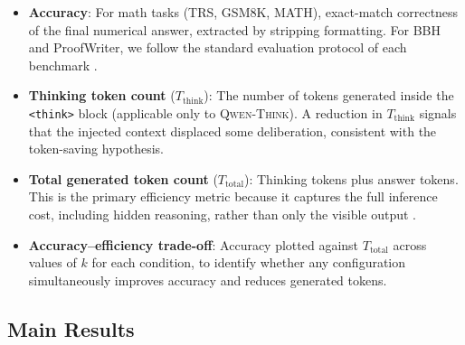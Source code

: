 \begin{itemize}
  \item \textbf{Accuracy}: For math tasks (TRS, GSM8K, MATH), exact-match
        correctness of the final numerical answer, extracted by stripping formatting.
        For BBH and ProofWriter, we follow the standard evaluation protocol of
        each benchmark \cite{suzgun2022bbh, tafjord2021proofwriter}.
  \item \textbf{Thinking token count} ($T_\mathrm{think}$): The number of tokens
        generated inside the \texttt{<think>} block (applicable only to
        \textsc{Qwen-Think}).
        A reduction in $T_\mathrm{think}$ signals that the injected context
        displaced some deliberation, consistent with the token-saving hypothesis.
  \item \textbf{Total generated token count} ($T_\mathrm{total}$): Thinking tokens
        plus answer tokens.  This is the primary efficiency metric because it
        captures the full inference cost, including hidden reasoning, rather than
        only the visible output \cite{leviathan2025prompt}.
  \item \textbf{Accuracy–efficiency trade-off}: Accuracy plotted against
        $T_\mathrm{total}$ across values of $k$ for each condition,
        to identify whether any configuration simultaneously improves accuracy
        and reduces generated tokens.
\end{itemize}

\subsection{Main Results}
\label{subsec:main-results}


